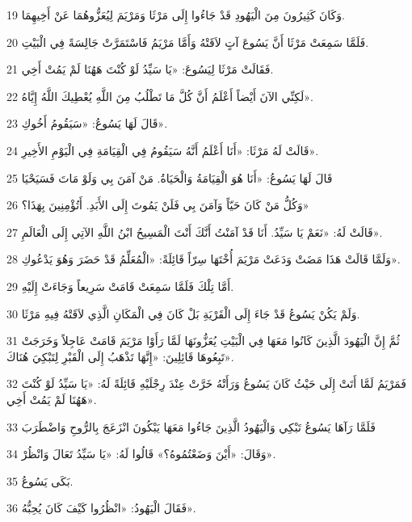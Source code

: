 \par 19 وَكَانَ كَثِيرُونَ مِنَ الْيَهُودِ قَدْ جَاءُوا إِلَى مَرْثَا وَمَرْيَمَ لِيُعَزُّوهُمَا عَنْ أَخِيهِمَا.
\par 20 فَلَمَّا سَمِعَتْ مَرْثَا أَنَّ يَسُوعَ آتٍ لاَقَتْهُ وَأَمَّا مَرْيَمُ فَاسْتَمَرَّتْ جَالِسَةً فِي الْبَيْتِ.
\par 21 فَقَالَتْ مَرْثَا لِيَسُوعَ: «يَا سَيِّدُ لَوْ كُنْتَ هَهُنَا لَمْ يَمُتْ أَخِي.
\par 22 لَكِنِّي الآنَ أَيْضاً أَعْلَمُ أَنَّ كُلَّ مَا تَطْلُبُ مِنَ اللَّهِ يُعْطِيكَ اللَّهُ إِيَّاهُ».
\par 23 قَالَ لَهَا يَسُوعُ: «سَيَقُومُ أَخُوكِ».
\par 24 قَالَتْ لَهُ مَرْثَا: «أَنَا أَعْلَمُ أَنَّهُ سَيَقُومُ فِي الْقِيَامَةِ فِي الْيَوْمِ الأَخِيرِ».
\par 25 قَالَ لَهَا يَسُوعُ: «أَنَا هُوَ الْقِيَامَةُ وَالْحَيَاةُ. مَنْ آمَنَ بِي وَلَوْ مَاتَ فَسَيَحْيَا
\par 26 وَكُلُّ مَنْ كَانَ حَيّاً وَآمَنَ بِي فَلَنْ يَمُوتَ إِلَى الأَبَدِ. أَتُؤْمِنِينَ بِهَذَا؟»
\par 27 قَالَتْ لَهُ: «نَعَمْ يَا سَيِّدُ. أَنَا قَدْ آمَنْتُ أَنَّكَ أَنْتَ الْمَسِيحُ ابْنُ اللَّهِ الآتِي إِلَى الْعَالَمِ».
\par 28 وَلَمَّا قَالَتْ هَذَا مَضَتْ وَدَعَتْ مَرْيَمَ أُخْتَهَا سِرّاً قَائِلَةً: «الْمُعَلِّمُ قَدْ حَضَرَ وَهُوَ يَدْعُوكِ».
\par 29 أَمَّا تِلْكَ فَلَمَّا سَمِعَتْ قَامَتْ سَرِيعاً وَجَاءَتْ إِلَيْهِ.
\par 30 وَلَمْ يَكُنْ يَسُوعُ قَدْ جَاءَ إِلَى الْقَرْيَةِ بَلْ كَانَ فِي الْمَكَانِ الَّذِي لاَقَتْهُ فِيهِ مَرْثَا.
\par 31 ثُمَّ إِنَّ الْيَهُودَ الَّذِينَ كَانُوا مَعَهَا فِي الْبَيْتِ يُعَزُّونَهَا لَمَّا رَأَوْا مَرْيَمَ قَامَتْ عَاجِلاً وَخَرَجَتْ تَبِعُوهَا قَائِلِينَ: «إِنَّهَا تَذْهَبُ إِلَى الْقَبْرِ لِتَبْكِيَ هُنَاكَ».
\par 32 فَمَرْيَمُ لَمَّا أَتَتْ إِلَى حَيْثُ كَانَ يَسُوعُ وَرَأَتْهُ خَرَّتْ عِنْدَ رِجْلَيْهِ قَائِلَةً لَهُ: «يَا سَيِّدُ لَوْ كُنْتَ هَهُنَا لَمْ يَمُتْ أَخِي».
\par 33 فَلَمَّا رَآهَا يَسُوعُ تَبْكِي وَالْيَهُودُ الَّذِينَ جَاءُوا مَعَهَا يَبْكُونَ انْزَعَجَ بِالرُّوحِ وَاضْطَرَبَ
\par 34 وَقَالَ: «أَيْنَ وَضَعْتُمُوهُ؟» قَالُوا لَهُ: «يَا سَيِّدُ تَعَالَ وَانْظُرْ».
\par 35 بَكَى يَسُوعُ.
\par 36 فَقَالَ الْيَهُودُ: «انْظُرُوا كَيْفَ كَانَ يُحِبُّهُ».
